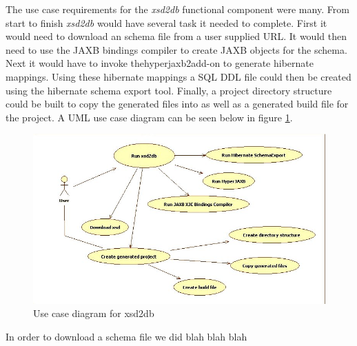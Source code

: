 The use case requirements for the \emph{xsd2db} functional component were many.  From start to finish \emph{xsd2db} would have several task it needed to complete.  First it would need to download an schema file from a user supplied URL.  It would then need to use the JAXB bindings compiler to create JAXB objects for the schema.  Next it would have to invoke thehyperjaxb2add-on to generate hibernate mappings.  Using these hibernate mappings a SQL DDL file could then be created using the hibernate schema export tool.  Finally, a project directory structure could be built to copy the generated files into as well as a generated build file for the project.  A UML use case diagram can be seen below in figure \ref{xsd2dbUMLUseCase}.

\begin{figure}[htbp]
\begin{center}
\includegraphics[scale=0.5]{./Images/xsd2dbUseCase.jpg}
\caption{Use case diagram for xsd2db}
\label{xsd2dbUMLUseCase}
\end{center}
\end{figure}

In order to download a schema file we did blah blah blah 

